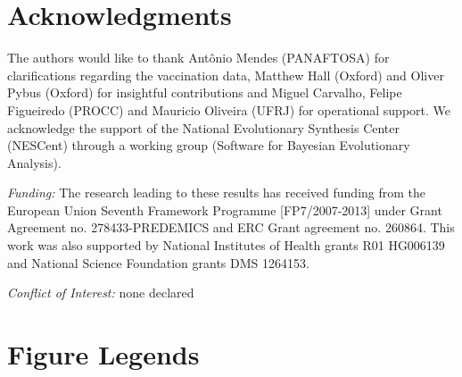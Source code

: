 \documentclass[10pt]{article}
\begin{document}
\section*{Acknowledgments}
The authors would like to thank Ant\^onio Mendes (PANAFTOSA) for clarifications regarding the vaccination data, Matthew Hall (Oxford) and Oliver Pybus (Oxford) for insightful contributions and Miguel Carvalho, Felipe Figueiredo (PROCC) and Mauricio Oliveira (UFRJ) for operational support.
We acknowledge the support of the National Evolutionary Synthesis Center (NESCent) through a working group (Software for Bayesian Evolutionary Analysis).

\emph{Funding:} The research leading to these results has received funding from the European Union Seventh Framework Programme [FP7/2007-2013] under Grant Agreement no. 278433-PREDEMICS and ERC Grant agreement no. 260864.
This work was also supported by National Institutes of Health grants R01 HG006139 and National Science Foundation grants DMS 1264153.

\emph{Conflict of Interest:} none declared

\newpage

\section*{Figure Legends}
\newpage
\end{document}
